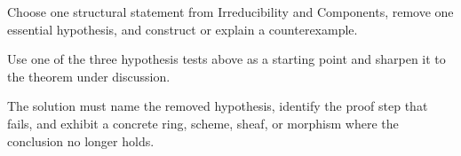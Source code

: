 \begin{exercise}\label{exr:vi05-expand-16}
Choose one structural statement from Irreducibility and Components, remove one essential hypothesis, and construct or explain a counterexample.
\end{exercise}
\begin{hint}
Use one of the three hypothesis tests above as a starting point and sharpen it to the theorem under discussion.
\end{hint}
\begin{solution}
The solution must name the removed hypothesis, identify the proof step that fails, and exhibit a concrete ring, scheme, sheaf, or morphism where the conclusion no longer holds.
\end{solution}


